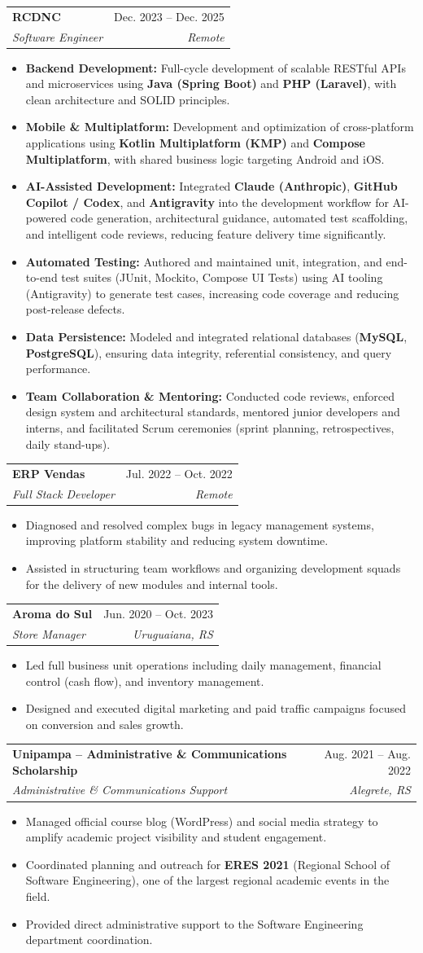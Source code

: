 \documentclass[letterpaper,11pt]{article}
\makeatletter
\newcommand{\resumeItem}[1]{
    \item\small{
            {#1 \vspace{-2pt}}
    }
}
\newcommand{\resumeSubheading}[4]{
    \vspace{-2pt}\item
    \begin{tabular*}{0.97\textwidth}[t]{l@{\extracolsep{\fill}}r}
    \textbf{#1} & #2 \\
    \textit{\small#3} & \textit{\small #4} \\
    \end{tabular*}\vspace{-7pt}
}
\newcommand{\resumeItemListStart}{\begin{itemize}}
\newcommand{\resumeItemListEnd}{\end{itemize}\vspace{-5pt}}
\makeatother
\begin{document}
\resumeSubheading
{RCDNC}{Dec. 2023 -- Dec. 2025}
{Software Engineer}{Remote}
\resumeItemListStart
    \resumeItem{\textbf{Backend Development:} Full-cycle development of scalable RESTful APIs and microservices using \textbf{Java (Spring Boot)} and \textbf{PHP (Laravel)}, with clean architecture and SOLID principles.}
    \resumeItem{\textbf{Mobile \& Multiplatform:} Development and optimization of cross-platform applications using \textbf{Kotlin Multiplatform (KMP)} and \textbf{Compose Multiplatform}, with shared business logic targeting Android and iOS.}
    \resumeItem{\textbf{AI-Assisted Development:} Integrated \textbf{Claude (Anthropic)}, \textbf{GitHub Copilot / Codex}, and \textbf{Antigravity} into the development workflow for AI-powered code generation, architectural guidance, automated test scaffolding, and intelligent code reviews, reducing feature delivery time significantly.}
    \resumeItem{\textbf{Automated Testing:} Authored and maintained unit, integration, and end-to-end test suites (JUnit, Mockito, Compose UI Tests) using AI tooling (Antigravity) to generate test cases, increasing code coverage and reducing post-release defects.}
    \resumeItem{\textbf{Data Persistence:} Modeled and integrated relational databases (\textbf{MySQL}, \textbf{PostgreSQL}), ensuring data integrity, referential consistency, and query performance.}
    \resumeItem{\textbf{Team Collaboration \& Mentoring:} Conducted code reviews, enforced design system and architectural standards, mentored junior developers and interns, and facilitated Scrum ceremonies (sprint planning, retrospectives, daily stand-ups).}
\resumeItemListEnd

\resumeSubheading
{ERP Vendas}{Jul. 2022 -- Oct. 2022}
{Full Stack Developer}{Remote}
\resumeItemListStart
    \resumeItem{Diagnosed and resolved complex bugs in legacy management systems, improving platform stability and reducing system downtime.}
    \resumeItem{Assisted in structuring team workflows and organizing development squads for the delivery of new modules and internal tools.}
\resumeItemListEnd

\resumeSubheading
{Aroma do Sul}{Jun. 2020 -- Oct. 2023}
{Store Manager}{Uruguaiana, RS}
\resumeItemListStart
    \resumeItem{Led full business unit operations including daily management, financial control (cash flow), and inventory management.}
    \resumeItem{Designed and executed digital marketing and paid traffic campaigns focused on conversion and sales growth.}
\resumeItemListEnd

\resumeSubheading
{Unipampa -- Administrative \& Communications Scholarship}{Aug. 2021 -- Aug. 2022}
{Administrative \& Communications Support}{Alegrete, RS}
\resumeItemListStart
    \resumeItem{Managed official course blog (WordPress) and social media strategy to amplify academic project visibility and student engagement.}
    \resumeItem{Coordinated planning and outreach for \textbf{ERES 2021} (Regional School of Software Engineering), one of the largest regional academic events in the field.}
    \resumeItem{Provided direct administrative support to the Software Engineering department coordination.}
\resumeItemListEnd
\end{document}

